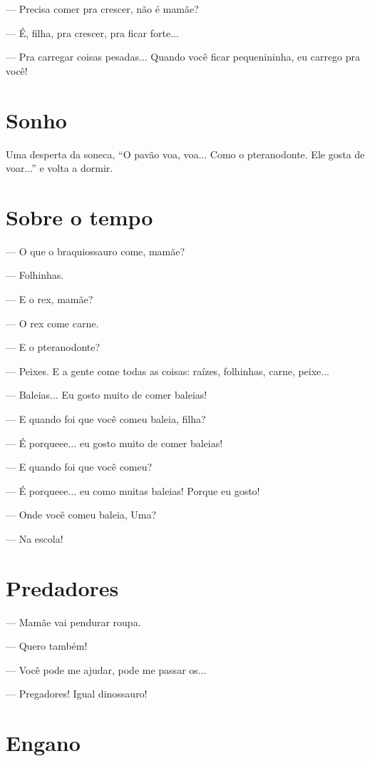 {— Precisa comer pra crescer, não é mamãe?

— É, filha, pra crescer, pra ficar forte...

— Pra carregar coisas pesadas... Quando você ficar pequenininha, eu
carrego pra você!

\chapter{Sonho}

Uma desperta da soneca, ``O pavão voa, voa... Como o pteranodonte. Ele
gosta de voar...'' e volta a dormir.

\chapter{Sobre o tempo}

— O que o braquiossauro come, mamãe?

— Folhinhas.

— E o rex, mamãe?

— O rex come carne.

— E o pteranodonte?

— Peixes. E a gente come todas as coisas: raízes, folhinhas, carne,
peixe...

— Baleias... Eu gosto muito de comer baleias!

— E quando foi que você comeu baleia, filha?

— É porqueee... eu gosto muito de comer baleias!

— E quando foi que você comeu?

— É porqueee... eu como muitas baleias! Porque eu gosto!

— Onde você comeu baleia, Uma?

— Na escola!

\chapter{Predadores}

— Mamãe vai pendurar roupa.

— Quero também!

— Você pode me ajudar, pode me passar os...

— Pregadores! Igual dinossauro!

\chapter{Engano}

}
